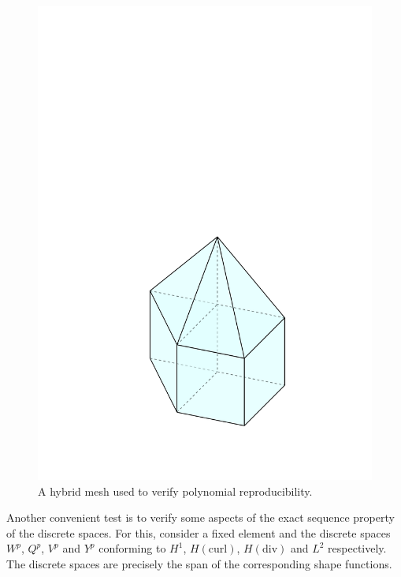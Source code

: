 \begin{figure}[!ht]
\begin{center}
\includegraphics[scale=0.5]{./figures/VerificationMesh.pdf}
\caption{A hybrid mesh used to verify polynomial reproducibility.}
\label{fig:VerificationMesh}
\end{center}
\end{figure}


Another convenient test is to verify some aspects of the exact sequence property of the discrete spaces.
For this, consider a fixed element and the discrete spaces $W^p$, $Q^p$, $V^p$ and $Y^p$ conforming to $H^1$, $H(\mathrm{curl})$, $H(\mathrm{div})$ and $L^2$ respectively.
The discrete spaces are precisely the span of the corresponding shape functions.

